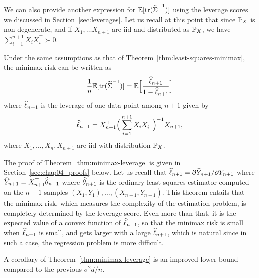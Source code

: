 We can also provide another expression for $\E [\tr (\wt \bSigma^{-1})]$ using the leverage scores we discussed in Section~\ref{sec:leverages}.
Let us recall at this point that since $\P_X$ is non-degenerate, and if $X_1, \ldots X_{n+1}$ are iid and distributed as $\P_X$, we have $\sum_{i=1}^{n+1} X_i X_i^\top \succ 0$.
\begin{theorem}
	\label{thm:minimax-leverage}
	Under the same assumptions as that of Theorem~\ref{thm:least-squares-minimax}, the minimax risk can be written as
	\begin{equation*}
		\frac 1n \E [\tr ( \wt \bSigma^{-1}) ] = \E \Big[ \frac{\wh \ell_{n+1}}{1 - \wh \ell_{n+1}} \Big]
	\end{equation*}
	where $\wh \ell_{n+1}$ is the leverage of one data point among $n+1$ given by
	\begin{equation*}
		\wh \ell_{n+1} = X_{n+1}^\top \Big( \sum_{i=1}^{n+1} X_i X_i^\top \Big)^{-1} X_{n+1},
	\end{equation*}
	where $X_1, \ldots, X_n, X_{n+1}$ are iid with distribution $\P_X$.
\end{theorem}

The proof of Theorem~\ref{thm:minimax-leverage} is given in Section~\ref{sec:chap04_proofs} below.
Let us recall that $\wh \ell_{n+1} = \partial \wh Y_{n+1} / \partial Y_{n+1}$ where $\wh Y_{n+1} = X_{n+1}^\top \wh \theta_{n+1}$ where $\wh \theta_{n+1}$ is the ordinary least squares estimator computed on the $n+1$ samples $(X_1, Y_1), \ldots, (X_{n+1}, Y_{n+1})$. 
This theorem entails that the minimax risk, which measures the complexity of the estimation problem,  is completely determined by the leverage score. 
Even more than that, it is the expected value of a convex function of $\wh \ell_{n+1}$, so that the minimax risk is small when $\wh \ell_{n+1}$ is small, and gets larger with a large $\wh \ell_{n+1}$, which is natural since in such a case, the regression problem is more difficult. 

A corollary of Theorem~\ref{thm:minimax-leverage} is an improved lower bound compared to the previous $\sigma^2 d / n$.

